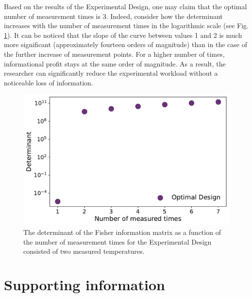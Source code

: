 \documentclass[10pt,A4paper]{article}
\begin{document}
Based on the results of the Experimental Design, one may claim that the optimal number of measurement times is 3.
Indeed, consider how the determinant increases with the number of measurement times in the logarithmic scale (see Fig. \ref{fig:det_vs_ntimes}).
It can be noticed that the slope of the curve between values 1 and 2 is much more significant (approximately fourteen orders of magnitude) than in the case of the further increase of measurement points.
For a higher number of times, informational profit stays at the same order of magnitude.
As a result, the researcher can significantly reduce the experimental workload without a noticeable loss of information.
\begin{figure}[H]
    \centering
    \includegraphics[scale=0.4]{Figures/det_vs_ntimes.pdf}
    \caption{{\footnotesize The determinant of the Fisher information matrix as a function of the number of measurement times for the Experimental Design consisted of two measured temperatures.}}
    \label{fig:det_vs_ntimes}
\end{figure}
%
%
%
\section*{Supporting information}
%
%
%
\nolinenumbers

\end{document}
